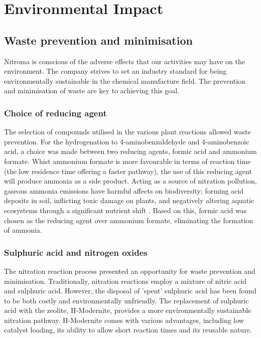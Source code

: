 \section{Environmental Impact}

\subsection{Waste prevention and minimisation}

Nitroma is conscious of the adverse effects that our activities may have on the environment. The company strives to set an industry standard for being environmentally sustainable in the chemical manufacture field. The prevention and minimisation of waste are key to achieving this goal. 

\subsubsection{Choice of reducing agent}
The selection of compounds utilised in the various plant reactions allowed waste prevention. For the hydrogenation to 4-aminobenzaldehyde and 4-aminobenzoic acid, a choice was made between two reducing agents, formic acid and ammonium formate. Whist ammonium formate is more favourable in terms of reaction time (the low residence time offering a faster pathway), the use of this reducing agent will produce ammonia as a side product. Acting as a  source of nitration pollution, gaseous ammonia emissions have harmful affects on biodiversity; forming acid deposits in soil, inflicting toxic damage on plants, and negatively altering aquatic ecosystems through a significant nutrient shift \cite{european_environment_agency_ammonia_2019}. Based on this, formic acid was chosen as the reducing agent over ammonium formate, eliminating the formation of ammonia. 

\subsubsection{Sulphuric acid and nitrogen oxides}
The nitration reaction process presented an opportunity for waste prevention and minimisation. Traditionally, nitration reactions employ a mixture of nitric acid and sulphuric acid. However, the disposal of 'spent' sulphuric acid has been found to be both costly and environmentally unfriendly. The replacement of sulphuric acid with the zeolite, H-Modernite, provides a more environmentally sustainable nitration pathway. H-Modernite comes with various advantages, including low catalyst loading, its ability to allow short reaction times and its reusable nature. 


